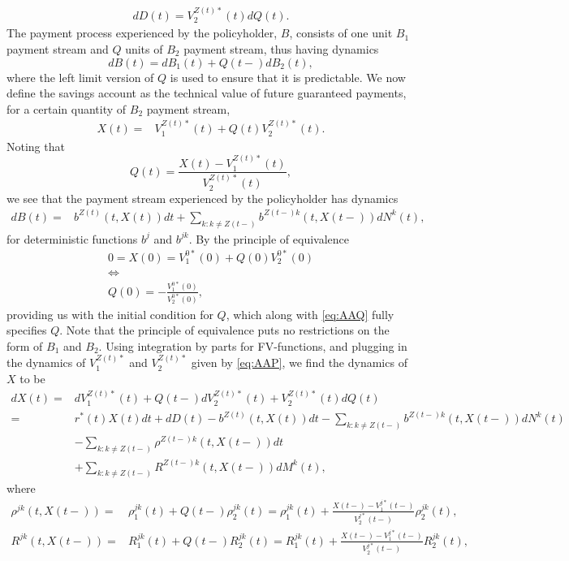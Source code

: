 \documentclass[12pt]{article}
\newcommand{\E}{\text{E}}
\theoremstyle{my_thm}
\begin{document}
\begin{align}
dD(t)=V_2^{Z(t)*}(t)dQ(t). \label{eq:AAQ}
\end{align}
The payment process experienced by the policyholder, $B$, consists of one unit $B_1$ payment stream and $Q$ units of $B_2$ payment stream, thus having dynamics
$$
dB(t)=dB_1(t)+ Q(t-)dB_2(t),
$$
where the left limit version of $Q$ is used to ensure that it is predictable. We now define the savings account as the technical value of future guaranteed payments, for a certain quantity of $B_2$ payment stream,
\begin{align*}
X(t)=&
V_1^{Z(t)*}(t)+Q(t)V_2^{Z(t)*}(t). 
\end{align*}
Noting that
$$
Q(t)=\frac{X(t)-V_1^{Z(t)*}(t)}{V_2^{Z(t)*}(t)},
$$
we see that the payment stream experienced by the policyholder has dynamics
\begin{align*}
dB(t)%
=&b^{Z(t)}(t,X(t)) dt +\sum_{k:k \neq Z(t-)} b^{Z(t-)k}(t,X(t-))dN^k(t),
\end{align*}
for deterministic functions $b^j$ and $b^{jk}$. By the principle of equivalence
\begin{gather*}
0=X(0)=V_1^{0*}(0)+Q(0)V_2^{0*}(0)
\\
\Leftrightarrow
\\
Q(0)=-\frac{V_1^{0*}(0)}{V_2^{0*}(0)},
\end{gather*}
providing us with the initial condition for $Q$, which along with \eqref{eq:AAQ} fully specifies $Q$. Note that the principle of equivalence puts no restrictions on the form of $B_1$ and $B_2$. Using integration by parts for FV-functions, and plugging in the dynamics of $V_1^{Z(t)*}$ and $V_2^{Z(t)*}$ given by \eqref{eq:AAP}, we find the dynamics of $X$ to be
\begin{align}
dX(t)=&
dV_1^{Z(t)*}(t)+Q(t-)dV_2^{Z(t)*}(t)+V_2^{Z(t)*}(t)dQ(t) \nonumber
\\
=&
r^*(t)X(t)dt
 +dD(t)
 -b^{Z(t)}(t,X(t)) dt
- \sum_{k:k \neq Z(t-)} b^{Z(t-)k}(t,X(t-)) dN^k(t)
\nonumber \\
&- \sum_{k:k \neq Z(t-)} \rho^{Z(t-)k}(t,X(t-))dt
\nonumber \\
&+ \sum_{k:k \neq Z(t-)}  R^{Z(t-)k}(t,X(t-))dM^k(t),\label{eq:AAB}
\end{align}
where
\begin{align*}
\rho^{jk}(t,X(t-))=&\rho_1^{jk}(t)+Q(t-)\rho_2^{jk}(t)=\rho_1^{jk}(t)+\frac{X(t-)-V_1^{j*}(t-)}{V_2^{j*}(t-)}\rho_2^{jk}(t),
\\
R^{jk}(t,X(t-))=&R_1^{jk}(t)+Q(t-)R_2^{jk}(t)=R_1^{jk}(t)+\frac{X(t-)-V_1^{j*}(t-)}{V_2^{j*}(t-)}R_2^{jk}(t),
\end{align*}
\end{document}
